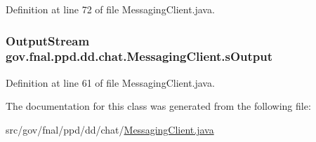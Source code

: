 Definition at line 72 of file Messaging\-Client.\-java.

\hypertarget{classgov_1_1fnal_1_1ppd_1_1dd_1_1chat_1_1MessagingClient_aad2bc447bb305f210db3d55142adc077}{
\subsubsection[{s\-Output}]{\setlength{\rightskip}{0pt plus 5cm}Output\-Stream gov.\-fnal.\-ppd.\-dd.\-chat.\-Messaging\-Client.\-s\-Output\hspace{0.3cm}{\ttfamily [protected]}}}\label{classgov_1_1fnal_1_1ppd_1_1dd_1_1chat_1_1MessagingClient_aad2bc447bb305f210db3d55142adc077}


Definition at line 61 of file Messaging\-Client.\-java.



The documentation for this class was generated from the following file\-:\begin{DoxyCompactItemize}
\item 
src/gov/fnal/ppd/dd/chat/\hyperlink{MessagingClient_8java}{Messaging\-Client.\-java}\end{DoxyCompactItemize}
